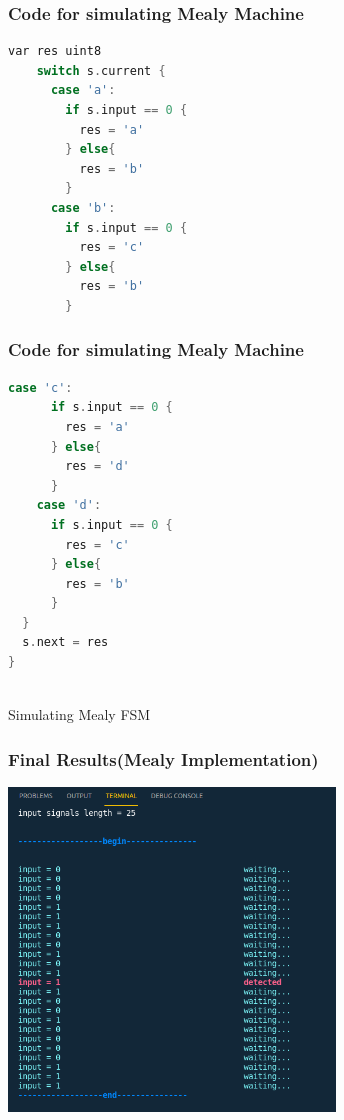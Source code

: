 \documentclass[xcolor=table]{beamer}
\begin{document}
\begin{frame}[fragile]
  \frametitle{Code for simulating Mealy Machine}
\begin{lstlisting}[language=C,keywordstyle=\bf,stringstyle=\it]
    var res uint8 
    switch s.current {
      case 'a':
        if s.input == 0 {
          res = 'a'
        } else{
          res = 'b'
        }
      case 'b':
        if s.input == 0 {
          res = 'c'
        } else{
          res = 'b'
        }

\end{lstlisting}
\end{frame}

\begin{frame}[fragile]
  \frametitle{Code for simulating Mealy Machine}
\begin{lstlisting}[language=C,keywordstyle=\bf,stringstyle=\it]
    case 'c':
      if s.input == 0 {
        res = 'a'
      } else{
        res = 'd'
      }
    case 'd':
      if s.input == 0 {
        res = 'c'
      } else{
        res = 'b'
      }
  }
  s.next = res
}
  
  \end{lstlisting}
\end{frame}


\begin{frame}{Simulating Mealy FSM}
\end{frame}


\begin{frame}
  \frametitle{Final Results(Mealy Implementation)}
  \centering
  \includegraphics[width=0.65\textwidth, height=0.85\textheight]{./static/res_mealy_sim.png}
\end{frame}
\end{document}
